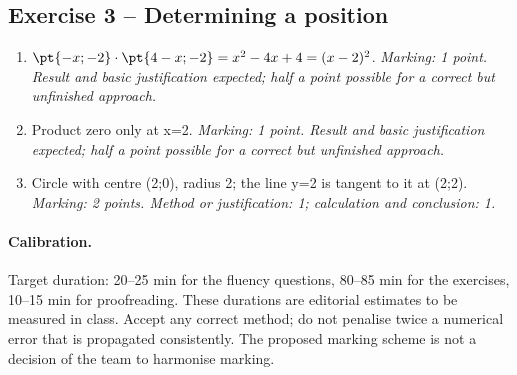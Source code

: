 \subsection*{Exercise 3 -- Determining a position}
\begin{enumerate}
\item $\pt{-x;-2}\cdot\pt{4-x;-2}=x^2-4x+4=(x-2)^2$. \textit{Marking: 1 point. Result and basic justification expected; half a point possible for a correct but unfinished approach.}
\item Product zero only at x=2. \textit{Marking: 1 point. Result and basic justification expected; half a point possible for a correct but unfinished approach.}
\item Circle with centre (2;0), radius 2; the line y=2 is tangent to it at (2;2). \textit{Marking: 2 points. Method or justification: 1; calculation and conclusion: 1.}
\end{enumerate}
\paragraph{Calibration.} Target duration: 20--25 min for the fluency questions, 80--85 min for the exercises, 10--15 min for proofreading. These durations are editorial estimates to be measured in class. Accept any correct method; do not penalise twice a numerical error that is propagated consistently. The proposed marking scheme is not a decision of the team to harmonise marking.
